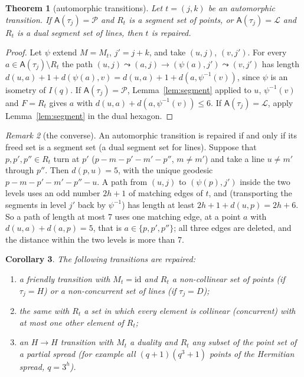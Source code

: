 \documentclass[11pt]{amsart}
\newtheorem{theorem}{Theorem}[section]
\newtheorem{corollary}[theorem]{Corollary}
\theoremstyle{definition}
\theoremstyle{remark}
\newtheorem{remark}[theorem]{Remark}
\numberwithin{equation}{section}
\newcommand{\cL}{\mathcal L}
\newcommand{\cP}{\mathcal P}
\begin{document}
\begin{theorem}[automorphic transitions]\label{thm:autotrans}
Let $t=(j,k)$ be an automorphic transition. If $\mathsf A(\tau_j)=\cP$ and $R_t$ is a segment set of points, or
$\mathsf A(\tau_j)=\cL$ and $R_t$ is a dual segment set of lines, then $t$ is repaired.
\end{theorem}

\begin{proof}
Let $\psi$ extend $M=M_t$, $j'=j+k$, and take $(u,j)$, $(v,j')$. For every $a\in\mathsf A(\tau_j)\setminus R_t$ the path
$(u,j)\leadsto(a,j)\to(\psi(a),j')\leadsto(v,j')$ has length $d(u,a)+1+d(\psi(a),v)=d(u,a)+1+d(a,\psi^{-1}(v))$, since $\psi$
is an isometry of $I(q)$. If $\mathsf A(\tau_j)=\cP$, Lemma~\ref{lem:segment} applied to $u$, $\psi^{-1}(v)$ and $F=R_t$
gives $a$ with $d(u,a)+d(a,\psi^{-1}(v))\le6$. If $\mathsf A(\tau_j)=\cL$, apply Lemma~\ref{lem:segment} in the dual
hexagon.
\end{proof}

\begin{remark}[the converse]\label{rem:converse}
An automorphic transition is repaired if and only if its freed set is a segment set (a dual segment set for lines).
Suppose that $p,p',p''\in R_t$ turn at $p'$ ($p-m-p'-m'-p''$, $m\ne m'$) and take a line $u\ne m'$ through $p''$. Then
$d(p,u)=5$, with the unique geodesic $p-m-p'-m'-p''-u$. A path from $(u,j)$ to $(\psi(p),j')$ inside the two levels uses an
odd number $2h+1$ of matching edges of $t$, and (transporting the segments in level $j'$ back by $\psi^{-1}$) has length at
least $2h+1+d(u,p)=2h+6$. So a path of length at most 7 uses one matching edge, at a point $a$ with $d(u,a)+d(a,p)=5$, that
is $a\in\{p,p',p''\}$; all three edges are deleted, and the distance within the two levels is more than 7.
\end{remark}

\begin{corollary}\label{cor:autotrans}
The following transitions are repaired:
\begin{enumerate}
\item a friendly transition with $M_t=\mathrm{id}$ and $R_t$ a non-collinear set of points (if $\tau_j=H$) or a
  non-concurrent set of lines (if $\tau_j=D$);
\item the same with $R_t$ a set in which every element is collinear (concurrent) with at most one other element of $R_t$;
\item an $H\to H$ transition with $M_t$ a duality and $R_t$ any subset of the point set of a partial spread (for example all
  $(q+1)(q^3+1)$ points of the Hermitian spread, $q=3^h$).
\end{enumerate}
\end{corollary}
\end{document}

